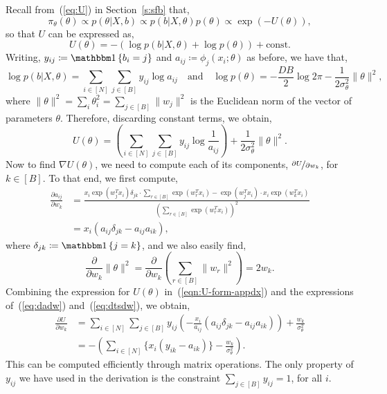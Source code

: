 Recall from~(\ref{eq:U}) in Section~\ref{s:sfb} that,
$$	\pi_\theta(\theta) \propto p(\theta | X, b) \propto p(b | X, \theta) p(\theta) \propto  \exp \left( - U(\theta) \right),
$$ 
so that $U$ can be expressed as,
$$
U(\theta) 
= - \left( \log p(b | X, \theta) + \log p(\theta) \right) + \textrm{const}.
$$
Writing,
$y_{ij} \coloneqq \one \left\{ b_i = j \right\}$ and 
$a_{ij} \coloneqq \phi_j(x_i; \theta)$ as before, we have that,
%
\begin{equation*}
	\log p(b | X, \theta) = \sum_{i \in [N]} \sum_{j \in [B]} y_{ij} \log a_{ij}  \quad \textrm{and} \quad
	\log p(\theta) = -\frac{D B}{2} \log 2\pi - \frac{1}{2 \sigma_\theta^2} 
	\|\theta \|^2,
	\label{eqn:U-constituent-terms}
\end{equation*}
%
where
$\|\theta\|^2 = \sum_{i} \theta_{i}^2 = \sum_{j \in [B]} \|w_j\|^2$ 
is the Euclidean norm of the vector of parameters $\theta$.
Therefore, discarding constant terms, we 
obtain,
%
\begin{equation}
	U(\theta) = \left( \sum_{i \in [N]} \sum_{j \in [B]} y_{ij} \log \frac{1}{a_{ij}} \right)
	+ \frac{1}{2\sigma_\theta^2} \|\theta\|^2.
	\label{eqn:U-form-appdx}
\end{equation}
%
Now to find $\nabla U(\theta)$, we need to compute
each of its components,
$\nicefrac{\partial U}{\partial w_k}$, for $k \in [B]$.
To that end, we first compute,
%
\begin{align}
	\frac{\partial a_{ij}}{\partial w_k} &= \frac
	{x_i \exp(w_j^T x_i) \delta_{jk} \cdot \sum_{r \in [B]} \exp(w_r^T x_i) 
		- 
		\exp(w_j^T x_i) \cdot x_i \exp(w_k^T x_i)}
	{\left( \sum_{r \in [B]} \exp(w_r^T x_i) \right)^2} \nonumber \\
	&= x_i \left( a_{ij} \delta_{jk} - a_{ij}a_{ik} \right), 
	\label{eq:dadw}
\end{align}
%
where $\delta_{jk} \coloneqq \one \left\{ j = k \right\}$,
and we also easily find,
%
\begin{equation}
	\frac{ \partial}{\partial w_k} \|\theta\|^2 = \frac{\partial}{\partial w_k} \left( \sum_{r \in [B]} \|w_r\|^2 \right) = 2w_k.
	\label{eq:dtsdw}
\end{equation}
%
Combining the expression for $U(\theta)$ in~(\ref{eqn:U-form-appdx}) and the expressions of~(\ref{eq:dadw}) and~(\ref{eq:dtsdw}), we obtain,
\begin{align}
	\frac{\partial U}{\partial w_k} &= 
	\sum_{i \in [N]} \sum_{j \in [B]} y_{ij} 
	\left( -\frac{x_i}{a_{ij}} \left( a_{ij} \delta_{jk} - a_{ij} a_{ik} \right) \right)
	+ \frac{w_k}{\sigma_\theta^2} \nonumber \\
	&= - \left( \sum_{i \in [N]} \Big\{ x_i (y_{ik} - a_{ik}) \Big\} - \frac{w_k}{\sigma_\theta^2} \right).
\end{align}
%
This can be computed 
efficiently through matrix operations. The only property of $y_{ij}$ 
we have used in the derivation is the constraint $\sum_{j \in [B]} y_{ij} = 1$,
for all $i$.

